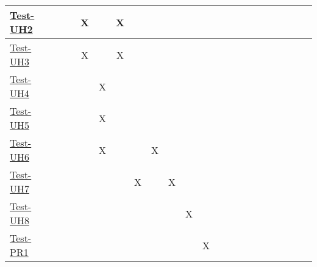 \documentclass[12pt, titlepage]{article}
\begin{document}
\begin{landscape}
\begin{table}[H]
\begin{adjustwidth}{-0.3in}{-0.5in}
{\begin{tabular}{c|c|c|c|c|c|c|c|c|c|c|c|c|c|c|c|c|c|c|c|c|c|}
\multicolumn{1}{|l|}{\hyperref[itm:Test-UH2]{Test-UH2}}   &             &             &            &      X       &              &      X       &             &             &              &              &              &              &             &             &             &          &&&&&    \\ \hline
\multicolumn{1}{|l|}{\hyperref[itm:Test-UH3]{Test-UH3}}   &             &             &             &     X        &              &     X        &             &             &              &              &              &              &             &             &             &       &  &&&&     \\ \hline
\multicolumn{1}{|l|}{\hyperref[itm:Test-UH4]{Test-UH4}}   &              &              &              &              &    X          &              &             &             &             &             &             &             &              &              &            &     &  &&&&       \\ \hline
\multicolumn{1}{|l|}{\hyperref[itm:Test-UH5]{Test-UH5}}   &             &             &             &             &      X       &             &             &             &              &              &              &              &             &             &             &      &   &&&&     \\ \hline
\multicolumn{1}{|l|}{\hyperref[itm:Test-UH6]{Test-UH6}}   &             &             &              &             &      X       &             &             &        X     &              &              &              &              &             &             &             &      &  &&&&      \\ \hline
\multicolumn{1}{|l|}{\hyperref[itm:Test-UH7]{Test-UH7}}   &             &             &              &             &             &           &  X           &             &      X        &              &              &              &             &             &             &      &  &&&&      \\ \hline
\multicolumn{1}{|l|}{\hyperref[itm:Test-UH8]{Test-UH8}}   &             &             &              &             &             &           &             &             &              &        X      &              &              &             &             &             &      &  &&&&      \\ \hline
\multicolumn{1}{|l|}{\hyperref[itm:Test-PR1]{Test-PR1}}   &             &             &              &             &             &             &             &             &              &              &      X        &              &             &             &             &       & &&&&      \\ \hline

\end{tabular}}
\end{adjustwidth}
\end{table}
\end{landscape}
\end{document}
